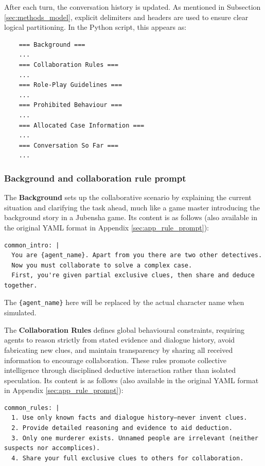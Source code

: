 \documentclass{article}
\begin{document}
After each turn, the conversation history is updated. As mentioned in Subsection \ref{sec:methods_model}, explicit delimiters and headers are used to ensure clear logical partitioning. In the Python script, this appears as:
\begin{verbatim}
    === Background ===
    ...
    === Collaboration Rules ===
    ...
    === Role-Play Guidelines ===
    ...
    === Prohibited Behaviour ===
    ...
    === Allocated Case Information ===
    ...
    === Conversation So Far ===
    ...
\end{verbatim}


\subsubsection{Background and collaboration rule prompt} \label{sec:methods_prompt_rule}

The \textbf{Background} sets up the collaborative scenario by explaining the current situation and clarifying the task ahead, much like a game master introducing the background story in a Jubensha game. Its content is as follows (also available in the original YAML format in Appendix \ref{sec:app_rule_prompt}):
\begin{verbatim}
common_intro: |
  You are {agent_name}. Apart from you there are two other detectives. 
  Now you must collaborate to solve a complex case.  
  First, you're given partial exclusive clues, then share and deduce together.
\end{verbatim}

The \texttt{\{agent\_name\}} here will be replaced by the actual character name when simulated.

The \textbf{Collaboration Rules} defines global behavioural constraints, requiring agents to reason strictly from stated evidence and dialogue history, avoid fabricating new clues, and maintain transparency by sharing all received information to encourage collaboration. These rules promote collective intelligence through disciplined deductive interaction rather than isolated speculation. Its content is as follows (also available in the original YAML format in Appendix \ref{sec:app_rule_prompt}):
\begin{verbatim}
common_rules: |
  1. Use only known facts and dialogue history—never invent clues.  
  2. Provide detailed reasoning and evidence to aid deduction.  
  3. Only one murderer exists. Unnamed people are irrelevant (neither suspects nor accomplices).
  4. Share your full exclusive clues to others for collaboration. 
\end{verbatim}
\end{document}
